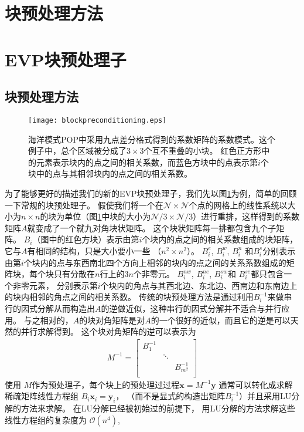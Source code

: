 \section{块预处理方法}
\label{sec:precond2}
\section{EVP块预处理子} \label{se:evp}
 

 

\subsection{块预处理方法}
 

\begin {figure}
\centering
\texttt{[image: blockpreconditioning.eps]}
\caption[] {海洋模式POP中采用九点差分格式得到的系数矩阵的系数模式。这个例子中，总个区域被分成了$3\times3$个互不重叠的小块。
红色正方形中的元素表示块内的点之间的相关系数，而蓝色方块中的点表示第$i$个块中的点与其相邻块内的点之间的相关系数。 \label{fig:blockprecond}}
\end{figure}
 
为了能够更好的描述我们的新的EVP块预处理子，我们先以图\ref{fig:blockprecond}为例，简单的回顾一下常规的块预处理子。 
假使我们将一个在$\mathcal{N} \times \mathcal{N}$个点的网格上的线性系统以大小为$n\times n$的块为单位（图\ref{fig:blockprecond}中块的大小为$\mathcal{N}/3\times \mathcal{N}/3$）进行重排，这样得到的系数矩阵$A$就变成了一个就九对角块状矩阵。
这个块状矩阵每一排都包含九个子矩阵。 
$B_i$（图中的红色方块）表示由第$i$个块内的点之间的相关系数组成的块矩阵，它与$A$有相同的结构，只是大小要小一些 （$n^2\times n^2$）。 
$B_i^e$, $B_i^w$, $B_i^n$ 和$B_i^s$分别表示由第$i$个块内的点与东西南北四个方向上相邻的块内的点之间的关系系数组成的矩阵块，每个块只有分散在$n$行上的$3n$个非零元。
$B_i^{nw}$, $B_i^{ne}$, $B_i^{sw}$和 $B_i^{se}$都只包含一个非零元素， 分别表示第$i$个块内的角点与其西北边、东北边、西南边和东南边上的块内相邻的角点之间的相关系数。 
传统的块预处理方法是通过利用$B_i^{-1}$来做串行的因式分解从而构造出$A$的逆做近似，这种串行的因式分解并不适合与并行应用。
与之相对的，$A$的块对角矩阵是对$A$的一个很好的近似，而且它的逆是可以天然的并行求解得到。
这个块对角矩阵的逆可以表示为 
\begin{eqnarray*}
M^{-1}=    \left [
        \begin{array}{ccccccc}
        B_1^{-1} &   &  \\
         & \ddots&  \\
        &   &  B_{m^2}^{-1} \\
    \end{array}
    \right ]
\end{eqnarray*}
使用 $M$作为预处理子，每个块上的预处理过过程$\textbf{x}
= M^{-1}\textbf{y}$ 通常可以转化成求解稀疏矩阵线性方程组 $B_i \textbf{x}_i = \textbf{y}_i$，
（而不是显式的构造出矩阵$B_i^{-1}$）并且采用LU分解的方法来求解。  
在LU分解已经被初始过的前提下， 用LU分解的方法求解这些线性方程组的复杂度为 $\mathcal{O}(n^4)$,
 


